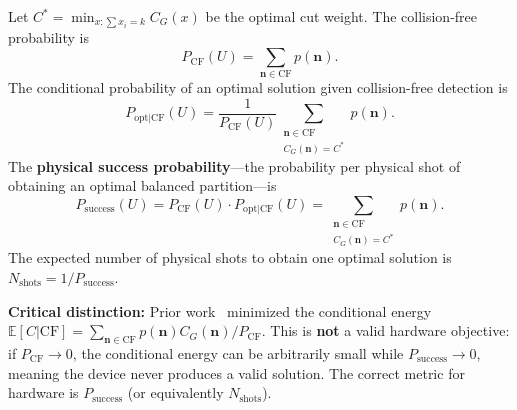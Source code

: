 Let $C^* = \min_{x: \sum x_i=k} C_G(x)$ be the optimal cut weight. The collision-free probability is
\begin{equation}
P_{\mathrm{CF}}(U) = \sum_{\mathbf{n} \in \mathrm{CF}} p(\mathbf{n}).
\end{equation}
The conditional probability of an optimal solution given collision-free detection is
\begin{equation}
P_{\mathrm{opt|CF}}(U) = \frac{1}{P_{\mathrm{CF}}(U)} \sum_{\substack{\mathbf{n} \in \mathrm{CF} \\ C_G(\mathbf{n})=C^*}} p(\mathbf{n}).
\end{equation}
The \textbf{physical success probability}---the probability per physical shot of obtaining an optimal balanced partition---is
\begin{equation}
\label{eq:p_success}
P_{\mathrm{success}}(U) = P_{\mathrm{CF}}(U) \cdot P_{\mathrm{opt|CF}}(U) = \sum_{\substack{\mathbf{n} \in \mathrm{CF} \\ C_G(\mathbf{n})=C^*}} p(\mathbf{n}).
\end{equation}
The expected number of physical shots to obtain one optimal solution is $N_{\mathrm{shots}} = 1/P_{\mathrm{success}}$.

\textbf{Critical distinction:} Prior work~\cite{wang2023bosonic} minimized the conditional energy $\mathbb{E}[C|\mathrm{CF}] = \sum_{\mathbf{n}\in\mathrm{CF}} p(\mathbf{n}) C_G(\mathbf{n}) / P_{\mathrm{CF}}$. This is \textbf{not} a valid hardware objective: if $P_{\mathrm{CF}}\to 0$, the conditional energy can be arbitrarily small while $P_{\mathrm{success}}\to 0$, meaning the device never produces a valid solution. The correct metric for hardware is $P_{\mathrm{success}}$ (or equivalently $N_{\mathrm{shots}}$).

